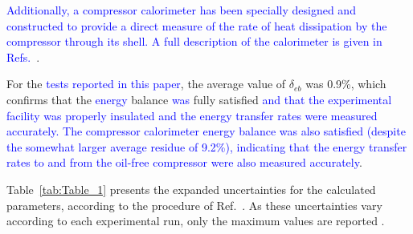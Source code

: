 \documentclass[review,preprint,12pt]{elsarticle}
\begin{document}
%

\textcolor{blue}{Additionally, a compressor calorimeter has been specially designed and constructed to provide a direct measure of the rate of heat dissipation by the compressor through its shell. A full description of the calorimeter is given in Refs.~\cite{OliveiraBarbosaJr.2016,Oliveira2016}}. %

%

For the \textcolor{blue}{tests reported in this paper}, the average value of $\delta_{eb}$ was 0.9\%, which confirms that the \textcolor{blue}{energy} balance \textcolor{blue}{was} fully satisfied \textcolor{blue}{and that the experimental facility was properly insulated and the energy transfer rates were measured accurately. The compressor calorimeter energy balance was also satisfied (despite the somewhat larger average residue of 9.2\%), indicating that the energy transfer rates to and from the oil-free compressor were also measured accurately}.  


Table~\ref{tab:Table_1} presents the expanded uncertainties for the calculated parameters, according to the procedure of Ref.~\cite{Coleman2009}. As these uncertainties vary according to each experimental run, only the maximum values are reported \cite{Oliveira2016}.
\end{document}
